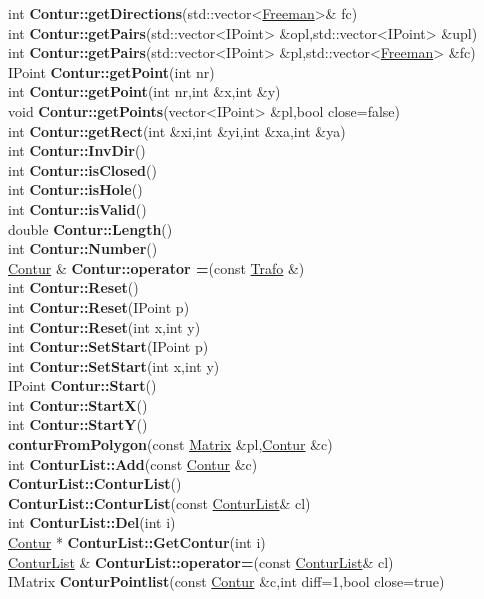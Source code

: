 \documentclass[10pt,titlepage]{article}
\def\functionlistentry#1#2#3#4#5#6{\noindent #1 {\bf #2}(#3) \dotfill #6\\}
\begin{document}
{{\functionlistentry{int}{Contur::getDirections}{std::vector\textless {}\hyperlink{Freeman}{Freeman}\textgreater {}\& fc}{422}{conturs}{}
\functionlistentry{int}{Contur::getPairs}{std::vector\textless {}IPoint\textgreater {} \&opl,std::vector\textless {}IPoint\textgreater {} \&upl}{423}{conturs}{}
\functionlistentry{int}{Contur::getPairs}{std::vector\textless {}IPoint\textgreater {} \&pl,std::vector\textless {}\hyperlink{Freeman}{Freeman}\textgreater {} \&fc}{424}{conturs}{}
\functionlistentry{IPoint}{Contur::getPoint}{int nr}{426}{conturs}{}
\functionlistentry{int}{Contur::getPoint}{int nr,int \&x,int \&y}{427}{conturs}{}
\functionlistentry{void}{Contur::getPoints}{vector<IPoint> \&pl,bool close=false}{428}{conturs}{}
\functionlistentry{int}{Contur::getRect}{int \&xi,int \&yi,int \&xa,int \&ya}{419}{conturs}{}
\functionlistentry{int}{Contur::InvDir}{}{406}{conturs}{}
\functionlistentry{int}{Contur::isClosed}{}{411}{conturs}{}
\functionlistentry{int}{Contur::isHole}{}{418}{conturs}{}
\functionlistentry{int}{Contur::isValid}{}{408}{conturs}{}
\functionlistentry{double}{Contur::Length}{}{410}{conturs}{}
\functionlistentry{int}{Contur::Number}{}{409}{conturs}{}
\functionlistentry{\hyperlink{Contur}{Contur} \&}{Contur::operator =}{const \hyperlink{Trafo}{Trafo} \&}{407}{conturs}{}
\functionlistentry{int}{Contur::Reset}{}{395}{conturs}{}
\functionlistentry{int}{Contur::Reset}{IPoint p}{396}{conturs}{}
\functionlistentry{int}{Contur::Reset}{int x,int y}{397}{conturs}{}
\functionlistentry{int}{Contur::SetStart}{IPoint p}{398}{conturs}{}
\functionlistentry{int}{Contur::SetStart}{int x,int y}{399}{conturs}{}
\functionlistentry{IPoint}{Contur::Start}{}{412}{conturs}{}
\functionlistentry{int}{Contur::StartX}{}{414}{conturs}{}
\functionlistentry{int}{Contur::StartY}{}{415}{conturs}{}
\functionlistentry{}{conturFromPolygon}{const \hyperlink{Matrix}{Matrix} \&pl,\hyperlink{Contur}{Contur} \&c}{463}{conturs}{}
\functionlistentry{int}{ConturList::Add}{const \hyperlink{Contur}{Contur} \&c}{456}{conturs}{}
\functionlistentry{}{ConturList::ConturList}{}{453}{conturs}{}
\functionlistentry{}{ConturList::ConturList}{const \hyperlink{ConturList}{ConturList}\& cl}{454}{conturs}{}
\functionlistentry{int}{ConturList::Del}{int i}{457}{conturs}{}
\functionlistentry{\hyperlink{Contur}{Contur} *}{ConturList::GetContur}{int i}{458}{conturs}{}
\functionlistentry{\hyperlink{ConturList}{ConturList} \&}{ConturList::operator=}{const \hyperlink{ConturList}{ConturList}\& cl}{455}{conturs}{}
\functionlistentry{IMatrix}{ConturPointlist}{const \hyperlink{Contur}{Contur} \&c,int diff=1,bool close=true}{429}{conturs}{}
}}
\end{document}
